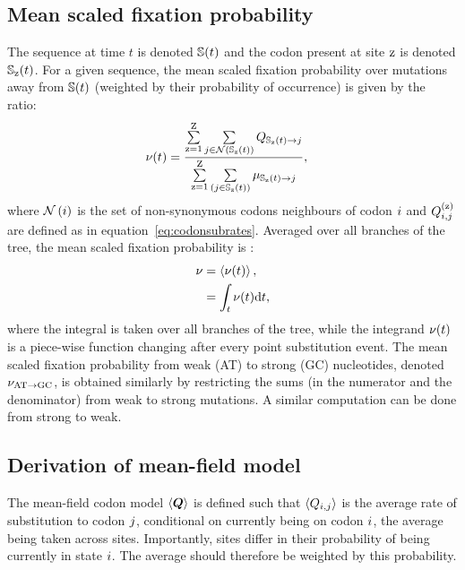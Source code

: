 \subsection{Mean scaled fixation probability}
\label{subsec:fixation-bias}
The sequence at time $t$ is denoted $\mathbb{S}(t)$ and the codon present at site $\text{z}$ is denoted $\mathbb{S}_{\text{z}}(t)$.
For a given sequence, the mean scaled fixation probability over mutations away from $\mathbb{S}(t)$ (weighted by their probability of occurrence) is given by the ratio:
\begin{align}
    \nu (t) & = \dfrac{ \sum\limits_{\text{z}=1}^{\text{Z}} \sum\limits_{{j} \in \mathcal{N} \left ( \mathbb{S}_{\text{z}}(t) \right)} Q_{\mathbb{S}_{\text{z}}(t) \to {j}}}{ \sum\limits_{\text{z}=1}^{\text{Z}} \sum\limits_{\left ( {j} \in \mathbb{S}_{\text{z}}(t) \right)} \mu_{\mathbb{S}_{\text{z}}(t) \to {j}}},
\end{align}
where $\mathcal{N}\left({i}\right)$ is the set of non-synonymous codons neighbours of codon ${i}$ and $Q_{{i}, {j}}^{(\text{z})}$ are defined as in equation~\ref{eq:codonsubrates}.
Averaged over all branches of the tree, the mean scaled fixation probability is :
\begin{align}
    \nu & = \left\langle \nu (t) \right\rangle, \\
    & = \int_{t} \nu (t) \text{d} t,
\end{align}
where the integral is taken over all branches of the tree, while the integrand $\nu (t)$ is a piece-wise function changing after every point substitution event.
The mean scaled fixation probability from weak (AT) to strong (GC) nucleotides, denoted $\nu_{\text{AT} \rightarrow \text{GC}}$, is obtained similarly by restricting the sums (in the numerator and the denominator) from weak to strong mutations.
A similar computation can be done from strong to weak.

\subsection{Derivation of mean-field model}
\label{subsec:mean-field-derivation}
The mean-field codon model $\left\langle \bm{Q} \right\rangle$ is defined such that $\left\langle Q_{{i}, {j}} \right\rangle$ is the average rate of substitution to codon ${j}$, conditional on currently being on codon ${i}$, the average being taken across sites.
Importantly, sites differ in their probability of being currently in state ${i}$.
The average should therefore be weighted by this probability.

